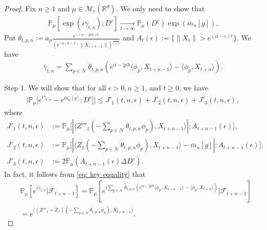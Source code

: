 \documentclass[12pt,a4paper]{amsart}
\theoremstyle{plain}
\theoremstyle{definition}
\numberwithin{equation}{section}
\begin{document}
\begin{proof}
    Fix $n\ge 1$ and $\mu\in\mathcal{M}_c(\mathbb{R}^d)$.
    We only need to show that
\begin{align}
    \mathbb{P}_{\mu}[\exp(i\bar{\gamma}_{t,n}); D^c]
    \xrightarrow[t\rightarrow \infty]{}\mathbb{P}_{\mu}(D^c)\exp(\bar{m}_n[g]).
\end{align}
    Put $\theta_{t,p,n}:=a_p\frac{e^{-(\alpha-|p|b)n}}{(e^{-\alpha(n-1)}\|X_{t+n-1}\|)^{\frac{1}{1+\beta}}}$ and 
    $A_t(\epsilon):=\{\|X_t\| > e^{(\alpha-\epsilon)t}\}$.
    We have
\begin{align}
    \bar{\gamma}_{t,n}=\sum_{p\in \mathcal{N}}\theta_{t,p,n}(e^{\alpha-|p|b}\langle \phi_p, X_{t+n-1}\rangle-\langle \phi_p, X_{t+n}\rangle).
\end{align}

	Step 1. We will show that for all $\epsilon > 0, n\geq 1$, and $t\geq 0$, we have
\begin{align}
    \big|\mathbb{P}_{\mu}\big[e^{i\bar{\gamma}_{t,n}}-e^{\bar{m}_n[g]}; D^c\big]\big|
    \leq J'_1(t,n,\epsilon)+J'_2(t,n,\epsilon)+J'_3(t,n,\epsilon),
\end{align}
	where
\begin{align}
\label{eq: Def of JJ1}
	J'_1(t,n,\epsilon)
    &:= \mathbb{P}_{\mu}\big[|\langle Z'''_1(-\sum_{p\in \mathcal{N}}\theta_{t,p,n}\phi_p), X_{t+n-1}\rangle|; A_{t+n-1}(\epsilon) \big],
	\\ J'_2(t,n,\epsilon)
	&:= \mathbb{P}_{\mu}\big[|\langle Z_1(-\sum_{p\in \mathcal{N}}\theta_{t,p,n}\phi_p),X_{t+n-1}\rangle-\bar{m}_n[g]|; A_{t+n-1}(\epsilon)\big],
	\\ J'_3(t,n, \epsilon)
	&:=2\mathbb{P}_{\mu}(A_{t+n-1}(\epsilon)\Delta D^c).
\end{align}
    In fact, it follows from \eqref{eq: key equality} that
\begin{align}
\label{eq: need11}
    &\displaystyle\mathbb{P}_{\mu}[e^{i\bar{\gamma}_{t,n}}|\mathscr{F}_{t+n-1}]
    =\mathbb{P}_{\mu}[e^{i\sum_{p\in \mathcal{N}}\theta_{t,p,n}(e^{\alpha-|p|b}\langle \phi_p,X_{t+n-1}\rangle-\langle \phi_p, X_{t+n}\rangle)}|\mathscr{F}_{t+n-1}]
    \\&=\displaystyle e^{\langle (Z'''_1+Z_1)(-\sum_{p\in \mathcal{N}}\theta_{t,p,n}\phi_p), X_{t+n-1} \rangle}.
\end{align}


\end{proof}
\end{document}
